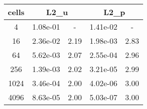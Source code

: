 \documentclass[10pt]{report}
\begin{document}
\begin{table}[H]
\begin{center}
\begin{tabular}{|c|c|c|c|c|} \hline
cells & 
\multicolumn{2}{|c|}{L2_u} & 
\multicolumn{2}{|c|}{L2_p}\\ \hline
4 & 1.08e-01 & - & 1.41e-02 & -\\ \hline
16 & 2.36e-02 & 2.19 & 1.98e-03 & 2.83\\ \hline
64 & 5.62e-03 & 2.07 & 2.55e-04 & 2.96\\ \hline
256 & 1.39e-03 & 2.02 & 3.21e-05 & 2.99\\ \hline
1024 & 3.46e-04 & 2.00 & 4.02e-06 & 3.00\\ \hline
4096 & 8.63e-05 & 2.00 & 5.03e-07 & 3.00\\ \hline
\end{tabular}
\end{center}
\end{table}
\end{document}
